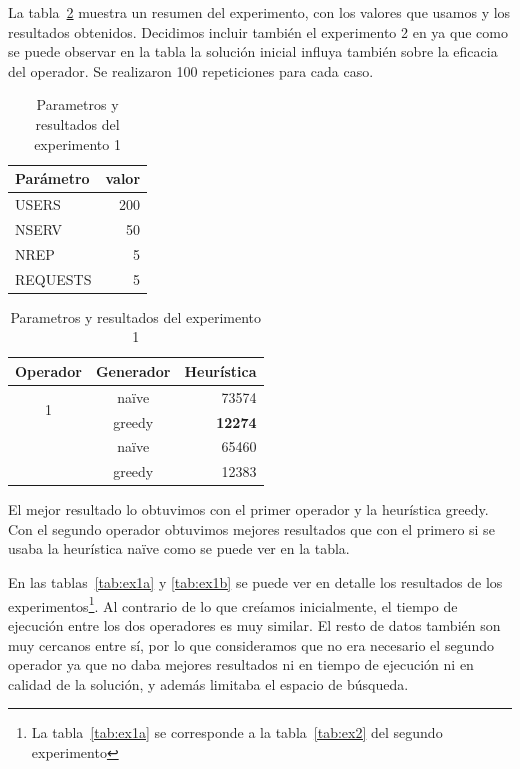 La tabla~\ref{tab:ex1} muestra un resumen del experimento, con los valores que usamos y los resultados obtenidos.
Decidimos incluir también el experimento 2 en ya que como se puede observar en la tabla la solución inicial
influya también sobre la eficacia del operador. Se realizaron 100 repeticiones para cada caso.

\begin{table}[H]
    \caption{Parametros y resultados del experimento 1}%
    \label{tab:ex1}
    \begin{center}
    \begin{tabular}{lr}
    \toprule
    Parámetro & valor \\
    \midrule
    USERS & 200 \\
    NSERV & 50 \\
    NREP & 5 \\
    REQUESTS & 5\\
    \bottomrule
    \end{tabular}
    \hspace{2em}
    \begin{tabular}{ccr}
    \toprule
    Operador & Generador & Heurística \\
    \midrule
    \multirow{2}{*}{1} & naïve &  73574\\
    {} & greedy & \textbf{12274} \\
    \addlinespace[0.5em]
    \multirow{2}{*}{2} & naïve &  65460\\
    {} & greedy & 12383 \\
    \bottomrule
    \end{tabular}
    \end{center}
\end{table}
\vspace{-1em}

El mejor resultado lo obtuvimos con el primer operador y la heurística greedy. Con el segundo operador
obtuvimos mejores resultados que con el primero si se usaba la heurística naïve como se puede ver en la
tabla.

En las tablas~\ref{tab:ex1a} y \ref{tab:ex1b} se puede ver en detalle los resultados de los experimentos\footnote{La tabla~\ref{tab:ex1a} se corresponde a la tabla~\ref{tab:ex2} del segundo experimento}. Al contrario
de lo que creíamos inicialmente, el tiempo de ejecución entre los dos operadores es muy similar. El resto
de datos también son muy cercanos entre sí, por lo que consideramos que no era necesario el segundo operador
ya que no daba mejores resultados ni en tiempo de ejecución ni en calidad de la solución, y además limitaba
el espacio de búsqueda.

